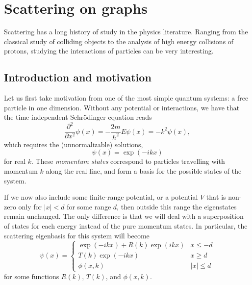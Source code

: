 \documentclass[../thesis-main/thesis-main]{subfiles}
\begin{document}
\chapter{Scattering on graphs}

Scattering has a long history of study in the physics literature.  Ranging from the classical study of colliding objects to the analysis of high energy collisions of protons, studying the interactions of particles can be very interesting.


\section{Introduction and motivation}


Let us first take motivation from one of the most simple quantum systems: a free particle in one dimension.  Without any potential or interactions, we have that the time independent Schr\"{o}dinger equation reads
\begin{equation}
  \frac{\partial^2}{\partial x^2} \psi(x) = -\frac{2m}{\hbar^2}E \psi(x) = -k^2 \psi(x),
\end{equation}
which requires the (unnormalizable) solutions,
\begin{equation}
  \psi(x) = \exp(- i k x) 
\end{equation}
for real $k$.  These \textit{momentum states} correspond to particles travelling with momentum $k$ along the real line, and form a basis for the possible states of the system.


If we now also include some finite-range potential, or a potential $V$ that is non-zero only for $|x| < d$ for some range $d$, then outside this range the eigenstates remain unchanged.  The only difference is that we will deal with a superposition of states for each energy instead of the pure momentum states.  In particular, the scattering eigenbasis for this system will become
\begin{equation}
  \psi(x) = \begin{cases}
    \exp(-i k x) + R(k) \exp(i k x) & x \leq -d\\
    T(k) \exp(- i k x) & x \geq d\\
    \phi(x,k) & |x| \leq d
    \end{cases}
\end{equation}
for some functions $R(k)$, $T(k)$, and $\phi(x,k)$.  
\end{document}

